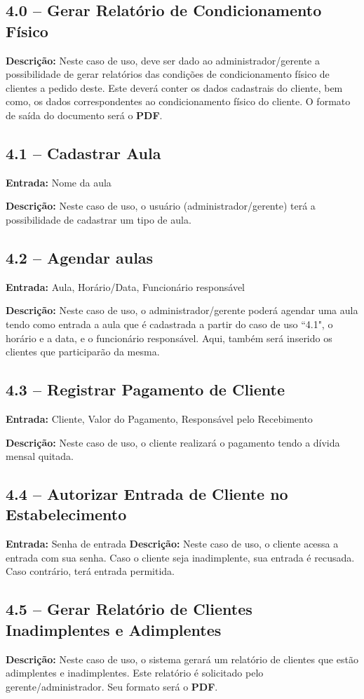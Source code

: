 \documentclass[12pt,a4paper,oneside]{report}
\begin{document}
	\subsection*{4.0 -- Gerar Relatório de Condicionamento Físico}
	\textbf{Descrição:} Neste caso de uso, deve ser dado ao administrador/gerente a possibilidade de gerar relatórios das condições de condicionamento físico de clientes a pedido deste. Este deverá conter os dados cadastrais do cliente, bem como, os dados correspondentes ao condicionamento físico do cliente. O formato de saída do documento será o \textbf{PDF}.
	
	\subsection*{4.1 -- Cadastrar Aula}
	\textbf{Entrada:} Nome da aula
	
	\textbf{Descrição:} Neste caso de uso, o usuário (administrador/gerente) terá a possibilidade de cadastrar um tipo de aula.
	
	\subsection*{4.2 -- Agendar aulas}
	\textbf{Entrada:} Aula, Horário/Data, Funcionário responsável
	
	\textbf{Descrição:} Neste caso de uso, o administrador/gerente poderá agendar uma aula tendo como entrada a aula que é cadastrada a partir do caso de uso ``4.1", o horário e a data, e o funcionário responsável. Aqui, também  será inserido os clientes que participarão da mesma.
	
	\subsection*{4.3 -- Registrar Pagamento de Cliente}
	\textbf{Entrada:} Cliente, Valor do Pagamento, Responsável pelo Recebimento
	
	\textbf{Descrição:} Neste caso de uso, o cliente realizará o pagamento tendo a dívida mensal quitada. 
	
	\subsection*{4.4 -- Autorizar Entrada de Cliente no Estabelecimento}
	\textbf{Entrada:} Senha de entrada
	\textbf{Descrição:} Neste caso de uso, o cliente acessa a entrada com sua senha. Caso o cliente seja inadimplente, sua entrada é recusada. Caso contrário, terá entrada permitida.
	
	\subsection*{4.5 -- Gerar Relatório de Clientes Inadimplentes e Adimplentes} 
	\textbf{Descrição:} Neste caso de uso, o sistema gerará um relatório de clientes que estão adimplentes e inadimplentes. Este relatório é solicitado pelo gerente/administrador. Seu formato será o \textbf{PDF}.
	
	
	
		
\end{document}
